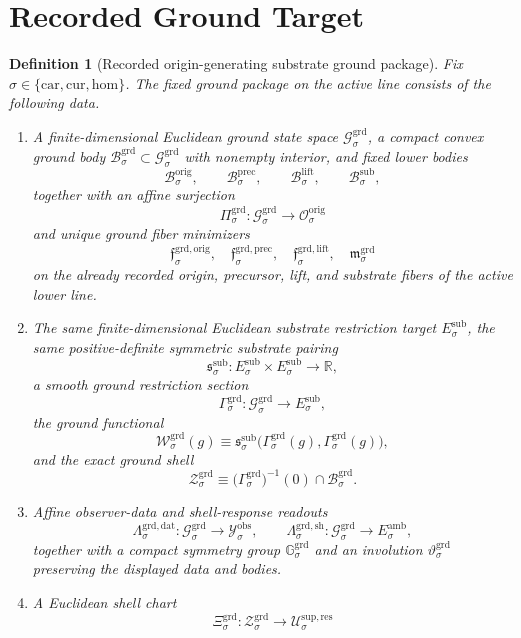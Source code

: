 \documentclass[11pt]{article}
\newcommand{\Car}{\mathrm{car}}
\newcommand{\Cur}{\mathrm{cur}}
\newcommand{\Hom}{\mathrm{hom}}
\newcommand{\DataSpace}[1]{\mathcal Y_{#1}^{\mathrm{obs}}}
\newcommand{\AmbientTarget}[1]{E_{#1}^{\mathrm{amb}}}
\newcommand{\SubBody}[1]{\mathcal B_{#1}^{\mathrm{sub}}}
\newcommand{\SubTarget}[1]{E_{#1}^{\mathrm{sub}}}
\newcommand{\SubPair}[1]{\mathfrak s_{#1}^{\mathrm{sub}}}
\newcommand{\LiftBody}[1]{\mathcal B_{#1}^{\mathrm{lift}}}
\newcommand{\PrecBody}[1]{\mathcal B_{#1}^{\mathrm{prec}}}
\newcommand{\OrigSpace}[1]{\mathcal O_{#1}^{\mathrm{orig}}}
\newcommand{\OrigBody}[1]{\mathcal B_{#1}^{\mathrm{orig}}}
\newcommand{\GroundSpace}[1]{\mathcal G_{#1}^{\mathrm{grd}}}
\newcommand{\GroundBody}[1]{\mathcal B_{#1}^{\mathrm{grd}}}
\newcommand{\GroundProj}[1]{\Pi_{#1}^{\mathrm{grd}}}
\newcommand{\GroundOrigMin}[1]{\mathfrak f_{#1}^{\mathrm{grd,orig}}}
\newcommand{\GroundPrecMin}[1]{\mathfrak f_{#1}^{\mathrm{grd,prec}}}
\newcommand{\GroundLiftMin}[1]{\mathfrak f_{#1}^{\mathrm{grd,lift}}}
\newcommand{\GroundSubMin}[1]{\mathfrak m_{#1}^{\mathrm{grd}}}
\newcommand{\GroundSection}[1]{\Gamma_{#1}^{\mathrm{grd}}}
\newcommand{\GroundFunctional}[1]{\mathscr W_{#1}^{\mathrm{grd}}}
\newcommand{\GroundData}[1]{\Lambda_{#1}^{\mathrm{grd,dat}}}
\newcommand{\GroundShellMap}[1]{\Lambda_{#1}^{\mathrm{grd,sh}}}
\newcommand{\GroundShellSet}[1]{\mathcal Z_{#1}^{\mathrm{grd}}}
\newcommand{\GroundSym}[1]{\mathbb G_{#1}^{\mathrm{grd}}}
\newcommand{\GroundTime}[1]{\vartheta_{#1}^{\mathrm{grd}}}
\newcommand{\GroundChart}[1]{\Xi_{#1}^{\mathrm{grd}}}
\newcommand{\ResSpace}[1]{\mathcal U_{#1}^{\mathrm{sup,res}}}
\newtheorem{definition}{Definition}
\begin{document}
\section{Recorded Ground Target}

\begin{definition}[Recorded origin-generating substrate ground package]
\label{def:ground}
Fix \(\sigma\in\{\Car,\Cur,\Hom\}\). The fixed ground package on the active line consists of the following data.
\begin{enumerate}
    \item A finite-dimensional Euclidean ground state space \(\GroundSpace{\sigma}\), a compact convex ground body \(\GroundBody{\sigma}\subset\GroundSpace{\sigma}\) with nonempty interior, and fixed lower bodies
    \[
    \OrigBody{\sigma},\qquad
    \PrecBody{\sigma},\qquad
    \LiftBody{\sigma},\qquad
    \SubBody{\sigma},
    \]
    together with an affine surjection
    \[
    \GroundProj{\sigma}:\GroundSpace{\sigma}\to\OrigSpace{\sigma}
    \]
    and unique ground fiber minimizers
    \[
    \GroundOrigMin{\sigma},\quad
    \GroundPrecMin{\sigma},\quad
    \GroundLiftMin{\sigma},\quad
    \GroundSubMin{\sigma}
    \]
    on the already recorded origin, precursor, lift, and substrate fibers of the active lower line.
    \item The same finite-dimensional Euclidean substrate restriction target \(\SubTarget{\sigma}\), the same positive-definite symmetric substrate pairing
    \[
    \SubPair{\sigma}:\SubTarget{\sigma}\times\SubTarget{\sigma}\to\mathbb R,
    \]
    a smooth ground restriction section
    \[
    \GroundSection{\sigma}:\GroundSpace{\sigma}\to\SubTarget{\sigma},
    \]
    the ground functional
    \[
    \GroundFunctional{\sigma}(g)
    \equiv
    \SubPair{\sigma}\bigl(\GroundSection{\sigma}(g),\GroundSection{\sigma}(g)\bigr),
    \]
    and the exact ground shell
    \[
    \GroundShellSet{\sigma}
    \equiv
    \bigl(\GroundSection{\sigma}\bigr)^{-1}(0)\cap\GroundBody{\sigma}.
    \]
    \item Affine observer-data and shell-response readouts
    \[
    \GroundData{\sigma}:\GroundSpace{\sigma}\to\DataSpace{\sigma},
    \qquad
    \GroundShellMap{\sigma}:\GroundSpace{\sigma}\to\AmbientTarget{\sigma},
    \]
    together with a compact symmetry group \(\GroundSym{\sigma}\) and an involution \(\GroundTime{\sigma}\) preserving the displayed data and bodies.
    \item A Euclidean shell chart
    \[
    \GroundChart{\sigma}:\GroundShellSet{\sigma}\to\ResSpace{\sigma}
\]
\end{enumerate}
\end{definition}
\end{document}
